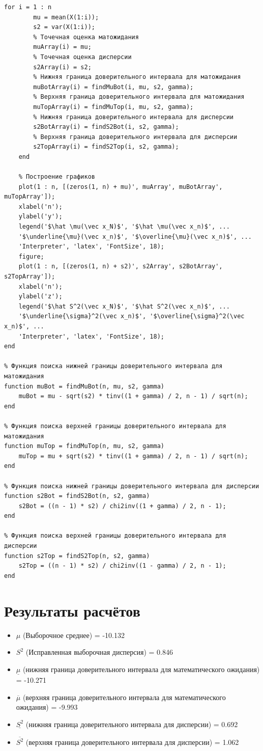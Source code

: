 \documentclass[12pt]{report}
\begin{document}
\begin{lstlisting}[mathescape]
	for i = 1 : n
		mu = mean(X(1:i));
		s2 = var(X(1:i));
		% Точечная оценка матожидания
		muArray(i) = mu;
		% Точечная оценка дисперсии
		s2Array(i) = s2;
		% Нижняя граница доверительного интервала для матожидания
		muBotArray(i) = findMuBot(i, mu, s2, gamma);
		% Верхняя граница доверительного интервала для матожидания
		muTopArray(i) = findMuTop(i, mu, s2, gamma);
		% Нижняя граница доверительного интервала для дисперсии
		s2BotArray(i) = findS2Bot(i, s2, gamma);
		% Верхняя граница доверительного интервала для дисперсии
		s2TopArray(i) = findS2Top(i, s2, gamma);
	end
	
	% Построение графиков
	plot(1 : n, [(zeros(1, n) + mu)', muArray', muBotArray', muTopArray']);
	xlabel('n');
	ylabel('y');
	legend('$\hat \mu(\vec x_N)$', '$\hat \mu(\vec x_n)$', ...
	'$\underline{\mu}(\vec x_n)$', '$\overline{\mu}(\vec x_n)$', ...
	'Interpreter', 'latex', 'FontSize', 18);
	figure;
	plot(1 : n, [(zeros(1, n) + s2)', s2Array', s2BotArray', s2TopArray']);
	xlabel('n');
	ylabel('z');
	legend('$\hat S^2(\vec x_N)$', '$\hat S^2(\vec x_n)$', ...
	'$\underline{\sigma}^2(\vec x_n)$', '$\overline{\sigma}^2(\vec x_n)$', ...
	'Interpreter', 'latex', 'FontSize', 18);
end

% Функция поиска нижней границы доверительного интервала для матожидания
function muBot = findMuBot(n, mu, s2, gamma)
	muBot = mu - sqrt(s2) * tinv((1 + gamma) / 2, n - 1) / sqrt(n);
end

% Функция поиска верхней границы доверительного интервала для матожидания
function muTop = findMuTop(n, mu, s2, gamma)
	muTop = mu + sqrt(s2) * tinv((1 + gamma) / 2, n - 1) / sqrt(n);
end

% Функция поиска нижней границы доверительного интервала для дисперсии
function s2Bot = findS2Bot(n, s2, gamma)
	s2Bot = ((n - 1) * s2) / chi2inv((1 + gamma) / 2, n - 1);
end

% Функция поиска верхней границы доверительного интервала для дисперсии
function s2Top = findS2Top(n, s2, gamma)
	s2Top = ((n - 1) * s2) / chi2inv((1 - gamma) / 2, n - 1);
end

\end{lstlisting}

\section*{Результаты расчётов}

\begin{itemize}
	\item $\mu$ (Выборочное среднее) = -10.132
	\item $S^2$ (Исправленная выборочная дисперсия) = 0.846
	\item $\underline{\mu}$ (нижняя граница доверительного интервала для математического ожидания) = -10.271
	\item $\overline{\mu}$ (верхняя граница доверительного интервала для математического ожидания) = -9.993
	\item $\underline{S^2}$ (нижняя граница доверительного интервала для дисперсии) = 0.692
	\item $\overline{S^2}$ (верхняя граница доверительного интервала для дисперсии) = 1.062
\end{itemize}
\end{document}
